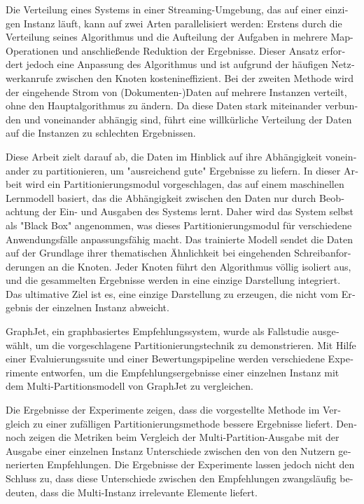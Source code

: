 \null\vfil
\begin{otherlanguage}{ngerman}
\begin{center}\textsf{\textbf{\abstractname}}\end{center}

\noindent
Die Verteilung eines Systems in einer Streaming-Umgebung, das auf einer einzigen Instanz läuft, kann auf zwei Arten parallelisiert werden: Erstens durch die Verteilung seines Algorithmus und die Aufteilung der Aufgaben in mehrere Map-Operationen und anschließende Reduktion der Ergebnisse. Dieser Ansatz erfordert jedoch eine Anpassung des Algorithmus und ist aufgrund der häufigen Netzwerkanrufe zwischen den Knoten kostenineffizient. Bei der zweiten Methode wird der eingehende Strom von (Dokumenten-)Daten auf mehrere Instanzen verteilt, ohne den Hauptalgorithmus zu ändern. Da diese Daten stark miteinander verbunden und voneinander abhängig sind, führt eine willkürliche Verteilung der Daten auf die Instanzen zu schlechten Ergebnissen.

Diese Arbeit zielt darauf ab, die Daten im Hinblick auf ihre Abhängigkeit voneinander zu partitionieren, um "ausreichend gute" Ergebnisse zu liefern. In dieser Arbeit wird ein Partitionierungsmodul vorgeschlagen, das auf einem maschinellen Lernmodell basiert, das die Abhängigkeit zwischen den Daten nur durch Beobachtung der Ein- und Ausgaben des Systems lernt. Daher wird das System selbst als "Black Box" angenommen, was dieses Partitionierungsmodul für verschiedene Anwendungsfälle anpassungsfähig macht. Das trainierte Modell sendet die Daten auf der Grundlage ihrer thematischen Ähnlichkeit bei eingehenden Schreibanforderungen an die Knoten. Jeder Knoten führt den Algorithmus völlig isoliert aus, und die gesammelten Ergebnisse werden in eine einzige Darstellung integriert. Das ultimative Ziel ist es, eine einzige Darstellung zu erzeugen, die nicht vom Ergebnis der einzelnen Instanz abweicht.

GraphJet, ein graphbasiertes Empfehlungssystem, wurde als Fallstudie ausgewählt, um die vorgeschlagene Partitionierungstechnik zu demonstrieren. Mit Hilfe einer Evaluierungssuite und einer Bewertungspipeline werden verschiedene Experimente entworfen, um die Empfehlungsergebnisse einer einzelnen Instanz mit dem Multi-Partitionsmodell von GraphJet zu vergleichen.


Die Ergebnisse der Experimente zeigen, dass die vorgestellte Methode im Vergleich zu einer zufälligen Partitionierungsmethode bessere Ergebnisse liefert. Dennoch zeigen die Metriken beim Vergleich der Multi-Partition-Ausgabe mit der Ausgabe einer einzelnen Instanz Unterschiede zwischen den von den Nutzern generierten Empfehlungen. Die Ergebnisse der Experimente lassen jedoch nicht den Schluss zu, dass diese Unterschiede zwischen den Empfehlungen zwangsläufig bedeuten, dass die Multi-Instanz irrelevante Elemente liefert.

\end{otherlanguage}
\vfil\null



